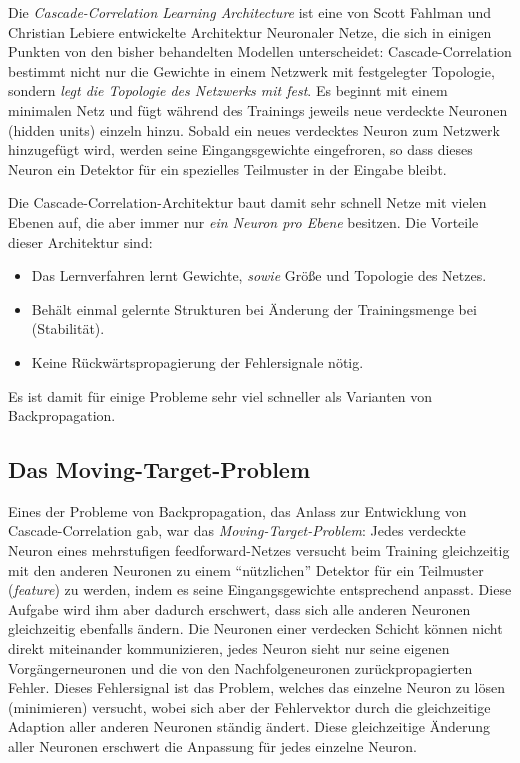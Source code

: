 Die \emph{Cascade-Correlation Learning Architecture} ist eine von Scott Fahlman und Christian Lebiere entwickelte Architektur Neuronaler Netze, die sich in einigen Punkten von den bisher behandelten Modellen unterscheidet: Cascade-Correlation bestimmt nicht nur die Gewichte in einem Netzwerk mit festgelegter Topologie, sondern \emph{legt die Topologie des Netzwerks
mit fest}. Es beginnt mit einem minimalen Netz und fügt während des Trainings jeweils neue verdeckte Neuronen (hidden units) einzeln hinzu.
Sobald ein neues verdecktes Neuron zum Netzwerk hinzugefügt wird, werden seine Eingangsgewichte eingefroren, so dass dieses Neuron ein Detektor für ein spezielles Teilmuster in der Eingabe bleibt.

Die Cascade-Correlation-Architektur baut damit sehr schnell Netze mit vielen Ebenen auf, die aber immer nur \emph{ein Neuron pro Ebene} besitzen.
Die Vorteile dieser Architektur sind:
\begin{itemize}
	\item Das Lernverfahren lernt Gewichte, \emph{sowie} Größe und Topologie des Netzes.
	\item Behält einmal gelernte Strukturen bei Änderung der Trainingsmenge bei (Stabilität).
	\item Keine Rückwärtspropagierung der Fehlersignale nötig.  
\end{itemize}

Es ist damit für einige Probleme sehr viel schneller als Varianten von Backpropagation.


\subsection*{Das Moving-Target-Problem}
Eines der Probleme von Backpropagation, das Anlass zur Entwicklung von Cascade-Correlation gab, war das \emph{Moving-Target-Problem}: Jedes verdeckte Neuron eines mehrstufigen feedforward-Netzes versucht beim Training gleichzeitig mit den anderen Neuronen zu einem "`nützlichen"' Detektor für ein Teilmuster (\emph{feature}) zu werden, indem es seine Eingangsgewichte entsprechend anpasst.
Diese Aufgabe wird ihm aber dadurch erschwert, dass sich alle anderen Neuronen gleichzeitig ebenfalls ändern. Die Neuronen einer verdecken Schicht können nicht direkt miteinander kommunizieren, jedes Neuron sieht nur seine eigenen Vorgängerneuronen und die von den Nachfolgeneuronen zurückpropagierten Fehler.
Dieses Fehlersignal ist das Problem, welches das einzelne Neuron zu lösen (minimieren) versucht, wobei sich aber der Fehlervektor durch die gleichzeitige Adaption aller anderen Neuronen ständig ändert. Diese gleichzeitige Änderung aller Neuronen erschwert die Anpassung für jedes einzelne Neuron.

